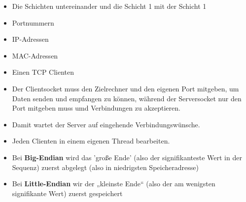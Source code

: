 
\begin{itemize}
    \item Die Schichten untereinander und die Schicht 1 mit der Schicht 1
\end{itemize}

\begin{itemize}
    \item Portnummern
    \item IP-Adressen
    \item MAC-Adressen
\end{itemize}

\begin{itemize}
    \item Einen TCP Clienten
\end{itemize}

\begin{itemize}
    \item Der Clientsocket muss den Zielrechner und den eigenen Port mitgeben, um Daten senden und empfangen zu können, während der Serversocket nur den Port mitgeben muss umd Verbindungen zu akzeptieren.
\end{itemize}

\begin{itemize}
    \item Damit wartet der Server auf eingehende Verbindungswünsche.
\end{itemize}

\begin{itemize}
    \item Jeden Clienten in einem eigenen Thread bearbeiten.
\end{itemize}

\begin{itemize}
    \item Bei \textbf{Big-Endian} wird das 'große Ende' (also der signifikanteste Wert in der Sequenz) zuerst abgelegt (also in niedrigsten Speicheradresse)
    \item Bei \textbf{Little-Endian} wir der „kleinste Ende“ (also der am wenigsten signifikante Wert) zuerst gespeichert
\end{itemize}

